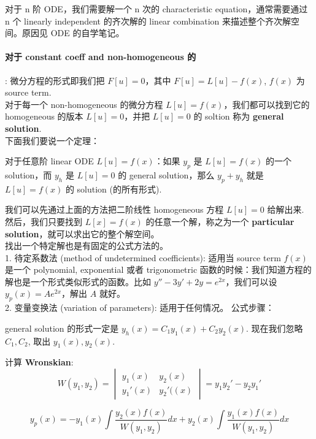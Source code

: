 \remark 
对于 n 阶 ODE，我们需要解一个 n 次的 characteristic equation，通常需要通过 n 个 linearly independent 的齐次解的 linear combination 来描述整个齐次解空间。原因见 ODE 的自学笔记。

\paragraph{对于 constant coeff and non-homogeneous 的}: 
微分方程的形式即我们把 $F[u] = 0 $，其中 $F[u] = L[u] - f(x)$, $f(x)$ 为 source term. 
\\对于每一个 non-homogeneous 的微分方程 $L[u] = f(x)$，我们都可以找到它的 homogeneous 的版本 $L[u] = 0$，并把 $L[u] = 0$ 的 soltion 称为 \textbf{general solution}.\\
下面我们要说一个定理：
\begin{theorem}
    对于任意阶 linear ODE $L[u] = f(x)$：如果 $y_p$ 是 $L[u] = f(x)$ 的一个 solution，而 $y_h$ 是 $L[u] = 0$ 的 general solution，那么 $y_p + y_h$ 就是 $L[u] = f(x)$ 的 solution (的所有形式).
\end{theorem}
我们可以先通过上面的方法把二阶线性 homogeneous 方程 $L[u] = 0$ 给解出来.\\
然后，我们只要找到 $L[x] = f(x)$ 的任意一个解，称之为一个 \textbf{particular solution}，就可以求出它的整个解空间。
\\找出一个特定解也是有固定的公式方法的。\\
1. 待定系数法 (method of undetermined coefficients): 适用当 source term $f(x)$ 是一个 polynomial, exponential 或者 trigonometric 函数的时候：我们知道方程的解也是一个形式类似形式的函数。比如 $y'' - 3y' + 2y = e^{2x}$，我们可以设 $y_p(x) = Ae^{2x}$，解出 $A$ 就好。\\
2. 变量变换法 (variation of parameters): 适用于任何情况。
公式步骤：
\begin{compactenumI}
    \item general solution 的形式一定是 $y_h(x) = C_1 y_1(x) + C_2 y_2(x)$. 现在我们忽略 $C_1, C_2$, 取出 $y_1(x), y_2(x)$.
    \item 计算 \textbf{Wronskian}: $$W(y_1, y_2) = \begin{vmatrix} y_1(x) & y_2(x) \\ y_1'(x) & y_2'((x) \end{vmatrix} = y_1y_2' - y_2y_1'$$
    \item $$y_p(x) = -y_1(x) \int{\frac{y_2(x)f(x)}{W(y_1, y_2)} dx} + y_2(x) \int{\frac{y_1(x)f(x)}{W(y_1, y_2)} dx}$$
\end{compactenumI}
